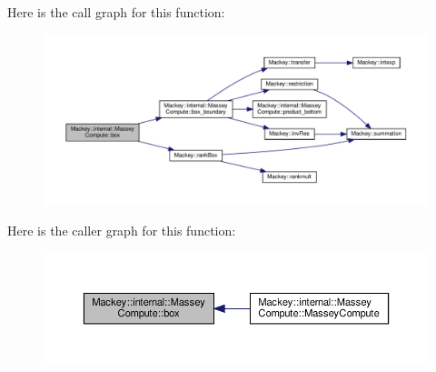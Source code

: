 Here is the call graph for this function\+:\nopagebreak
\begin{figure}[H]
\begin{center}
\leavevmode
\includegraphics[width=350pt]{structMackey_1_1internal_1_1MasseyCompute_aff177659d2dbcd9c3fe9d644d55141ca_cgraph}
\end{center}
\end{figure}
Here is the caller graph for this function\+:\nopagebreak
\begin{figure}[H]
\begin{center}
\leavevmode
\includegraphics[width=350pt]{structMackey_1_1internal_1_1MasseyCompute_aff177659d2dbcd9c3fe9d644d55141ca_icgraph}
\end{center}
\end{figure}
\mbox{\label{structMackey_1_1internal_1_1MasseyCompute_aa62c7436a98f7be7105e6ab0157cb431}} 
